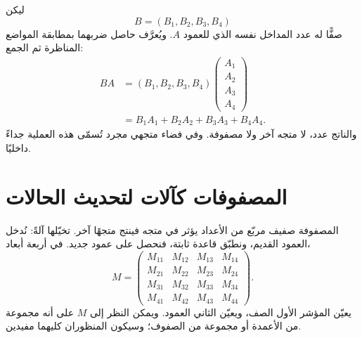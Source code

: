\begin{classroomqa}
\end{classroomqa}

ليكن
\begin{equation}
  B=(B_1,B_2,B_3,B_4)
\end{equation}
صفًّا له عدد المداخل نفسه الذي للعمود \(A\). ويُعرَّف حاصل ضربهما بمطابقة المواضع المناظرة ثم الجمع:
\begin{align}
  BA
  &=
  (B_1,B_2,B_3,B_4)
  \begin{pmatrix}
    A_1\\ A_2\\ A_3\\ A_4
  \end{pmatrix}\\
  &=B_1A_1+B_2A_2+B_3A_3+B_4A_4.
  \label{eq:l01-inner-product}
\end{align}
والناتج عدد، لا متجه آخر ولا مصفوفة. وفي فضاء متجهي مجرد تُسمّى هذه العملية جداءً داخليًا.

\begin{classroomqa}
\end{classroomqa}

\section{المصفوفات كآلات لتحديث الحالات}

المصفوفة صفيف مربّع من الأعداد يؤثر في متجه فينتج متجهًا آخر. تخيّلها آلةً: نُدخل العمود القديم، ونطبّق قاعدة ثابتة، فنحصل على عمود جديد. في أربعة أبعاد،
\begin{equation}
  M=
  \begin{pmatrix}
    M_{11}&M_{12}&M_{13}&M_{14}\\
    M_{21}&M_{22}&M_{23}&M_{24}\\
    M_{31}&M_{32}&M_{33}&M_{34}\\
    M_{41}&M_{42}&M_{43}&M_{44}
  \end{pmatrix}.
  \label{eq:l01-general-matrix}
\end{equation}
يعيّن المؤشر الأول الصف، ويعيّن الثاني العمود. ويمكن النظر إلى \(M\) على أنه مجموعة من الأعمدة أو مجموعة من الصفوف؛ وسيكون المنظوران كليهما مفيدين.

